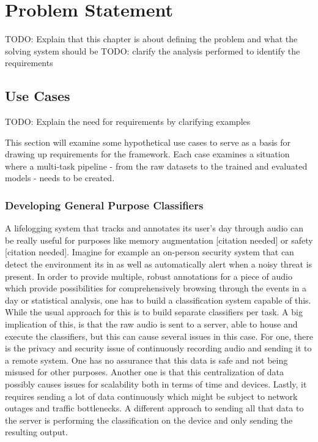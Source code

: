 \chapter{Problem Statement} \label{problem}
TODO: Explain that this chapter is about defining the problem and what the solving system should be
TODO: clarify the analysis performed to identify the requirements

\section{Use Cases}
TODO: Explain the need for requirements by clarifying examples

This section will examine some hypothetical use cases to serve as a basis for drawing up requirements for the framework. Each case examines a situation where a multi-task pipeline - from the raw datasets to the trained and evaluated models - needs to be created. 


\subsection{Developing General Purpose Classifiers}

A lifelogging system that tracks and annotates its user's day through audio can be really useful for purposes like memory augmentation [citation needed] or safety [citation needed]. Imagine for example an on-person security system that can detect the environment its in as well as automatically alert when a noisy threat is present. In order to provide multiple, robust annotations for a piece of audio which provide possibilities for comprehensively browsing through the events in a day or statistical analysis, one has to build a classification system capable of this. While the usual approach for this is to build separate classifiers per task. A big implication of this, is that the raw audio is sent to a server, able to house and execute the classifiers, but this can cause several issues in this case. For one, there is the privacy and security issue of continuously recording audio and sending it to a remote system. One has no assurance that this data is safe and not being misused for other purposes. Another one is that this centralization of data possibly causes issues for scalability both in terms of time and devices. Lastly, it requires sending a lot of data continuously which might be subject to network outages and traffic bottlenecks. A different approach to sending all that data to the server is performing the classification on the device and only sending the resulting output.\\

